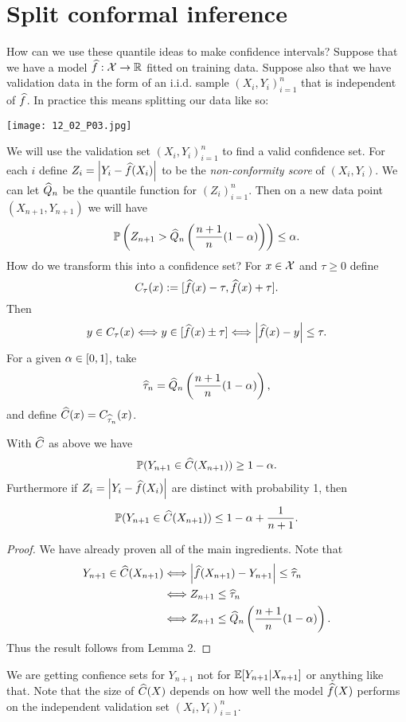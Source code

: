 \section{Split conformal inference}
How can we use these quantile ideas to make confidence intervals? Suppose that we have a model $\widehat{f} : {\mathcal{X}} \to {\mathbb R}$ fitted on training data. Suppose also that we have validation data in the form of an i.i.d. sample $(X_i,Y_i)_{i=1}^n$ that is independent of $\widehat{f}$. In practice this means splitting our data like so:
\begin{center}
    \texttt{[image: 12\_02\_P03.jpg]}
\end{center}
We will use the validation set $(X_i,Y_i)_{i=1}^n$ to find a valid confidence set. For each $i$ define $Z_i = {\left\lvert Y_i-\widehat{f}(X_i)\right\rvert}$ to be the \emph{non-conformity score} of $(X_i,Y_i)$. We can let $\widehat{Q}_n$ be the quantile function for $(Z_i)_{i=1}^n$. Then on a new data point $(X_{n+1},Y_{n+1})$ we will have 
\[{\mathbb{P}}\left(Z_{n+1} > \widehat{Q}_n\left(\frac{n+1}{n}(1-{\alpha})\right)\right) \le {\alpha}. \]
How do we transform this into a confidence set? For $x \in {\mathcal{X}}$ and $\tau \ge 0$ define 
\[C_\tau(x):= [\widehat{f}(x)-\tau, \widehat{f}(x)+\tau].  \]
Then 
\[y \in C_\tau(x) \Longleftrightarrow y \in[\widehat{f}(x)\pm \tau] \Longleftrightarrow {\left\lvert\widehat{f}(x)-y\right\rvert} \le \tau. \]
For a given ${\alpha}\in [0,1]$, take
\[\widehat{\tau}_n = \widehat{Q}_n\left(\frac{n+1}{n}(1-{\alpha})\right), \]
and define $\widehat{C}(x)=C_{\widehat{\tau}_n}(x)$.
\begin{prop}
    With $\widehat{C}$ as above we have 
    \[{\mathbb{P}}(Y_{n+1} \in \widehat{C}(X_{n+1})) \ge 1-{\alpha}. \]
    Furthermore if $Z_i={\left\lvert Y_i-\widehat{f}(X_i)\right\rvert}$ are distinct with probability 1, then 
    \[{\mathbb{P}}(Y_{n+1} \in \widehat{C}(X_{n+1})) \le 1-{\alpha}+\frac{1}{n+1}. \]
\end{prop}
\begin{proof}
    We have already proven all of the main ingredients. Note that
    \begin{align*}
        Y_{n+1} \in \widehat{C}(X_{n+1}) & \Longleftrightarrow {\left\lvert\widehat{f}(X_{n+1})-Y_{n+1}\right\rvert} \le \widehat{\tau}_n\\
        &\Longleftrightarrow Z_{n+1} \le \widehat{\tau}_n\\
        &\Longleftrightarrow Z_{n+1} \le \widehat{Q}_n\left(\frac{n+1}{n}(1-{\alpha})\right).
    \end{align*}
    Thus the result follows from Lemma 2.
\end{proof}
\begin{remark}
    We are getting confience sets for $Y_{n+1}$ not for ${\mathbb{E}}[Y_{n+1}|X_{n+1}]$ or anything like that. Note that the size of $\widehat{C}(X)$ depends on how well the model $\widehat{f}(X)$ performs on the independent validation set $(X_i,Y_i)_{i=1}^n$.
\end{remark}

